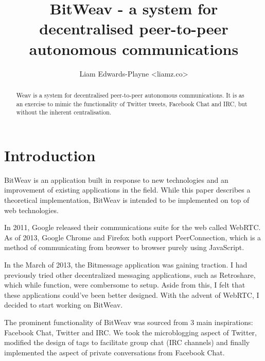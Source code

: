 \documentclass[10pt,a4paper,onecolumn]{article}
\author{Liam Edwards-Playne \textless liamz.co\textgreater}
\title{BitWeav - a system for decentralised peer-to-peer autonomous communications}
\begin{document}
\maketitle
\begin{abstract}
Weav is a system for decentralised peer-to-peer autonomous communications. It is as an exercise to mimic the functionality of Twitter tweets, Facebook Chat and IRC, but without the inherent centralisation. 
\end{abstract}

\section{Introduction}
BitWeav is an application built in response to new technologies and an improvement of existing applications in the field. While this paper describes a theoretical implementation, BitWeav is intended to be implemented on top of web technologies. 

In 2011, Google released their communications suite for the web called WebRTC. As of 2013, Google Chrome and Firefox both support PeerConnection, which is a method of communicating from browser to browser purely using JavaScript. 

In the March of 2013, the Bitmessage application was gaining traction. I had previously tried other decentralized messaging applications, such as Retroshare, which while function, were combersome to setup. Aside from this, I felt that these applications could've been better designed. With the advent of WebRTC, I decided to start working on BitWeav. 

The prominent functionality of BitWeav was sourced from 3 main inspirations: Facebook Chat, Twitter and IRC. We took the microblogging aspect of Twitter, modified the design of tags to facilitate group chat (IRC channels) and finally implemented the aspect of private conversations from Facebook Chat. 
\end{document}
